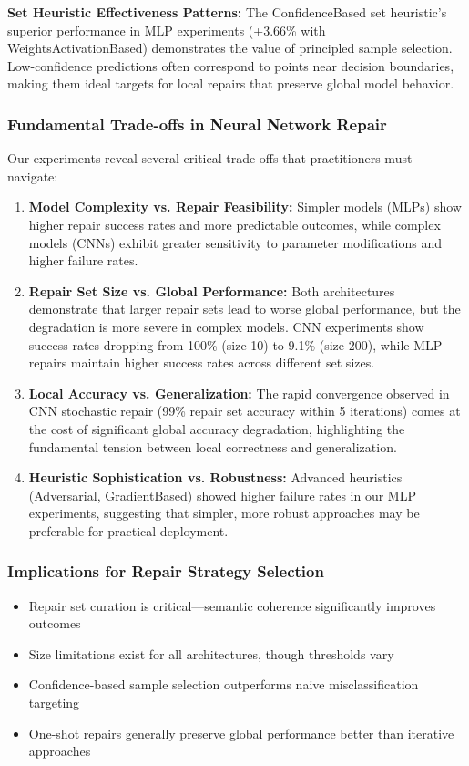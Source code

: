 \documentclass{article}
\begin{document}
\textbf{Set Heuristic Effectiveness Patterns:} The ConfidenceBased set heuristic's superior performance in MLP experiments (+3.66\% with WeightsActivationBased) demonstrates the value of principled sample selection. Low-confidence predictions often correspond to points near decision boundaries, making them ideal targets for local repairs that preserve global model behavior.

\subsubsection{Fundamental Trade-offs in Neural Network Repair}

Our experiments reveal several critical trade-offs that practitioners must navigate:

\begin{enumerate}
	\item \textbf{Model Complexity vs. Repair Feasibility:} Simpler models (MLPs) show higher repair success rates and more predictable outcomes, while complex models (CNNs) exhibit greater sensitivity to parameter modifications and higher failure rates.

	\item \textbf{Repair Set Size vs. Global Performance:} Both architectures demonstrate that larger repair sets lead to worse global performance, but the degradation is more severe in complex models. CNN experiments show success rates dropping from 100\% (size 10) to 9.1\% (size 200), while MLP repairs maintain higher success rates across different set sizes.

	\item \textbf{Local Accuracy vs. Generalization:} The rapid convergence observed in CNN stochastic repair (99\% repair set accuracy within 5 iterations) comes at the cost of significant global accuracy degradation, highlighting the fundamental tension between local correctness and generalization.

	\item \textbf{Heuristic Sophistication vs. Robustness:} Advanced heuristics (Adversarial, GradientBased) showed higher failure rates in our MLP experiments, suggesting that simpler, more robust approaches may be preferable for practical deployment.
\end{enumerate}

\subsubsection{Implications for Repair Strategy Selection}
\begin{itemize}
	\item Repair set curation is critical—semantic coherence significantly improves outcomes
	\item Size limitations exist for all architectures, though thresholds vary
	\item Confidence-based sample selection outperforms naive misclassification targeting
	\item One-shot repairs generally preserve global performance better than iterative approaches
\end{itemize}
\end{document}
